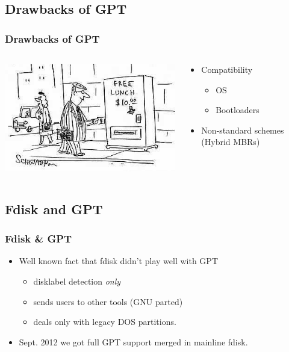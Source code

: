\subsection{Drawbacks of GPT}
\begin{frame}\frametitle{Drawbacks of GPT}
  \begin{columns}
    \begin{column}{.25\linewidth}
      \includegraphics[scale=1.3]{img/freelunch}
    \end{column}
    \begin{column}{.7\linewidth}
      \begin{itemize}
      \item Compatibility
        \begin{itemize}
        \item OS
        \item Bootloaders
        \end{itemize}
      \item Non-standard schemes (Hybrid MBRs)
      \end{itemize}
    \end{column}
  \end{columns}
\end{frame}

\subsection{Fdisk and GPT}
\begin{frame}\frametitle{Fdisk \& GPT}
  \begin{itemize}
  \item Well known fact that fdisk didn't play well with GPT
    \begin{itemize}
      \item disklabel detection \emph{only}
      \item sends users to other tools (GNU parted)
      \item deals only with legacy DOS partitions.
    \end{itemize}
  \item Sept. 2012 we got full GPT support merged in mainline fdisk.
  \end{itemize}
\end{frame}

